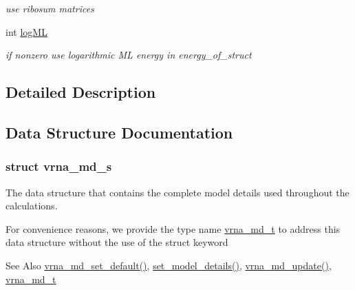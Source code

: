 \begin{DoxyCompactItemize}
\begin{DoxyCompactList}\small\item\em use ribosum matrices \end{DoxyCompactList}\item 
\hypertarget{group__model__details_ga80c3c5fd35e7479704cc91d2d0367743}{int \hyperlink{group__model__details_ga80c3c5fd35e7479704cc91d2d0367743}{log\-M\-L}}\label{group__model__details_ga80c3c5fd35e7479704cc91d2d0367743}

\begin{DoxyCompactList}\small\item\em if nonzero use logarithmic M\-L energy in energy\-\_\-of\-\_\-struct \end{DoxyCompactList}\end{DoxyCompactItemize}


\subsection{Detailed Description}


\subsection{Data Structure Documentation}
\label{structvrna__md__s}
\hypertarget{group__model__details_structvrna__md__s}{}
\subsubsection{struct vrna\-\_\-md\-\_\-s}
The data structure that contains the complete model details used throughout the calculations. 

For convenience reasons, we provide the type name \hyperlink{group__model__details_ga1f8a10e12a0a1915f2a4eff0b28ea17c}{vrna\-\_\-md\-\_\-t} to address this data structure without the use of the struct keyword

\begin{DoxySeeAlso}{See Also}
\hyperlink{group__model__details_ga8ac6ff84936282436f822644bf841f66}{vrna\-\_\-md\-\_\-set\-\_\-default()}, \hyperlink{group__model__details_gabad896c3650d420f3f3ddefc69e2bceb}{set\-\_\-model\-\_\-details()}, \hyperlink{group__model__details_ga36ae40b8c3b82362f5798ad5b047b814}{vrna\-\_\-md\-\_\-update()}, \hyperlink{group__model__details_ga1f8a10e12a0a1915f2a4eff0b28ea17c}{vrna\-\_\-md\-\_\-t} 
\end{DoxySeeAlso}
